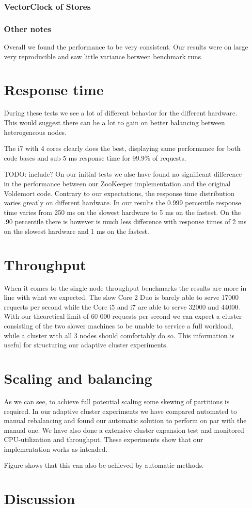 \subsubsection{VectorClock of Stores}

\subsubsection{Other notes}
Overall we found the performance to be very consistent. Our results were on large very reproducible and saw little variance between benchmark runs.

\section{Response time}
During these tests we see a lot of different behavior for the different hardware. This would suggest there can be a lot to gain on better balancing between heterogeneous nodes.


The i7 with 4 cores clearly does the best, displaying same performance for both code bases and sub 5 ms response time for 99.9\% of requests.

TODO: include?
On our initial tests we alse have found no significant difference in the performance between our ZooKeeper implementation and the original Voldemort code. Contrary to our expectations, the response time distribution varies greatly on different hardware. In our results the 0.999 percentile response time varies from 250 ms on the slowest hardware to 5 ms on the fastest. On the .90 percentile there is however is much less difference with response times of 2 ms on the slowest hardware and 1 ms on the fastest.

\section{Throughput}
\label{eval:throughput}
When it comes to the single node throughput benchmarks the results are more in line with what we expected. The slow Core 2 Duo is barely able to serve 17000 requests per second while the Core i5 and i7 are able to serve 32000 and 44000. With our theoretical limit of 60 000 requests per second we can expect a cluster consisting of the two slower machines to be unable to service a full workload, while a cluster with all 3 nodes should comfortably do so. This information is useful for structuring our adaptive cluster experiments.

\section{Scaling and balancing}
\label{eval:balance}
As we can see, to achieve full potential scaling some skewing of partitions is required. In our adaptive cluster experiments we have compared automated to manual rebalancing and found our automatic solution to perform on par with the manual one. We have also done a extensive cluster expansion test and monitored CPU-utilization and throughput. These experiments show that our implementation works as intended.

Figure shows that this can also be achieved by automatic methods.

\section{Discussion}
\label{eval:discussion}








